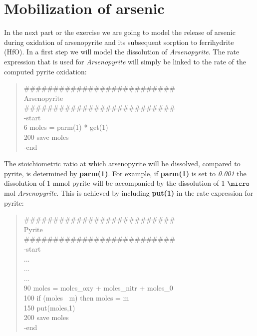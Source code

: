 \section[Mobilization of arsenic]{Mobilization of arsenic}

In the next part or the exercise we are going to model the release of arsenic 
during oxidation of arsenopyrite and its subsequent sorption to ferrihydrite (HfO). 
In a first step we will model the dissolution of \emph{Arsenopyrite}. 
The rate expression that is used for \emph{Arsenopyrite} will simply be linked
to the rate of the computed pyrite oxidation:

{\color{red}
\begin{quote}
\#\#\#\#\#\#\#\#\#\#\#\#\#\#\#\#\#\#\#\#\#\#\#\#\#\#\\
Arsenopyrite \\
\#\#\#\#\#\#\#\#\#\#\#\#\#\#\#\#\#\#\#\#\#\#\#\#\#\#\\
-start \\
  6 moles = parm(1) * get(1) \\
200 save moles \\
-end \\
\end{quote}}

The stoichiometric ratio at which arsenopyrite will be dissolved, compared to pyrite, is determined
by {\color{red} \textbf{parm(1)}}. For example, if {\color{red} \textbf{parm(1)}} is set to
\emph{0.001} the dissolution of 1 mmol pyrite will be accompanied by 
the dissolution of 1 $\micro$mol \emph{Arsenopyrite}.   
This is achieved by including {\color{red} \textbf{put(1)}}
in the rate expression for pyrite:

{\color{red}
\begin{quote}
\#\#\#\#\#\#\#\#\#\#\#\#\#\#\#\#\#\#\#\#\#\#\#\#\#\# \\
Pyrite \\
\#\#\#\#\#\#\#\#\#\#\#\#\#\#\#\#\#\#\#\#\#\#\#\#\#\# \\
-start \\
... \\
... \\
... \\
90 moles = moles\_oxy + moles\_nitr + moles\_0 \\
100 if (moles $\>$ m) then moles = m \\
150 put(moles,1) \\
200 save moles \\
-end \\
\end{quote}}

